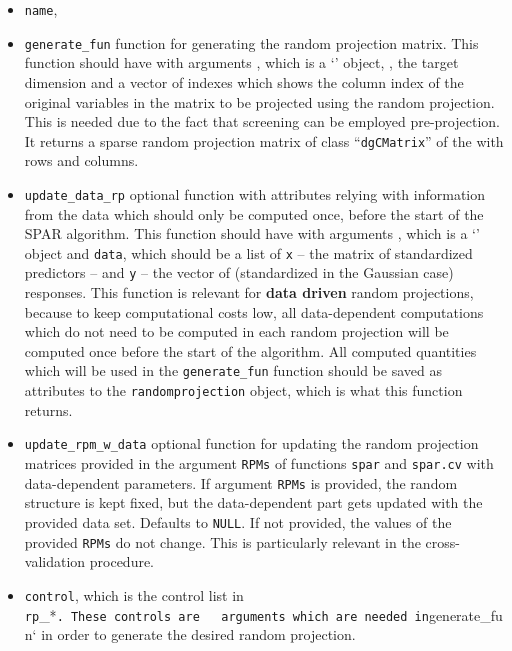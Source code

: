 \documentclass[
  article]{jss}
\newcommand{\class}[1]{`\code{#1}'}
\begin{document}
\begin{itemize}
\item
  \texttt{name},
\item
  \texttt{generate\_fun} function for generating the random projection
  matrix. This function should have with arguments , which is a
  \class{randomprojection} object, , the target dimension and a
  vector of indexes  which shows the column index
  of the original variables in the  matrix to be projected using
  the random projection. This is needed due to the fact that screening
  can be employed pre-projection. It returns a sparse random projection
  matrix of class ``\texttt{dgCMatrix}'' of the  with
   rows and  columns.
\item
  \texttt{update\_data\_rp} optional function with attributes relying
  with information from the data which should only be computed once,
  before the start of the SPAR algorithm. This function should have with
  arguments , which is a \class{randomprojection} object and
  \texttt{data}, which should be a list of \texttt{x} -- the matrix of
  standardized predictors -- and \texttt{y} -- the vector of
  (standardized in the Gaussian case) responses. This function is
  relevant for \textbf{data driven} random projections, because to keep
  computational costs low, all data-dependent computations which do not
  need to be computed in each random projection will be computed once
  before the start of the algorithm. All computed quantities which will
  be used in the \texttt{generate\_fun} function should be saved as
  attributes to the \texttt{randomprojection} object, which is what this
  function returns.
\item
  \texttt{update\_rpm\_w\_data} optional function for updating the
  random projection matrices provided in the argument \texttt{RPMs} of
  functions \texttt{spar} and \texttt{spar.cv} with data-dependent
  parameters. If argument \texttt{RPMs} is provided, the random
  structure is kept fixed, but the data-dependent part gets updated with
  the provided data set. Defaults to \texttt{NULL}. If not provided, the
  values of the provided \texttt{RPMs} do not change. This is
  particularly relevant in the cross-validation procedure.
\item
  \texttt{control}, which is the control list in
  \texttt{rp}\_*\texttt{.\ These\ controls\ are\ \ \ arguments\ which\ are\ needed\ in}generate\_fun`
  in order to generate the desired random projection.
\end{itemize}
\end{document}
